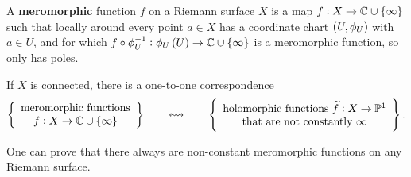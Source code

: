 A \textbf{meromorphic} function $ f $ on a Riemann surface $ X $ is a map $ f : X \to \C \cup \cbr{\infty} $ such that locally around every point $ a \in X $ has a coordinate chart $ \br{U, \phi_U} $ with $ a \in U $, and for which $ f \circ \phi_U^{-1} : \phi_U\br{U} \to \C \cup \cbr{\infty} $ is a meromorphic function, so only has poles.

\begin{lemma}
If $ X $ is connected, there is a one-to-one correspondence
$$ \correspondence{\text{meromorphic functions} \\ f : X \to \C \cup \cbr{\infty}}{\text{holomorphic functions} \ \widetilde{f} : X \to \P^1 \\ \text{that are not constantly} \ \infty}. $$
\end{lemma}

\begin{fact*}
One can prove that there always are non-constant meromorphic functions on any Riemann surface.
\end{fact*}

